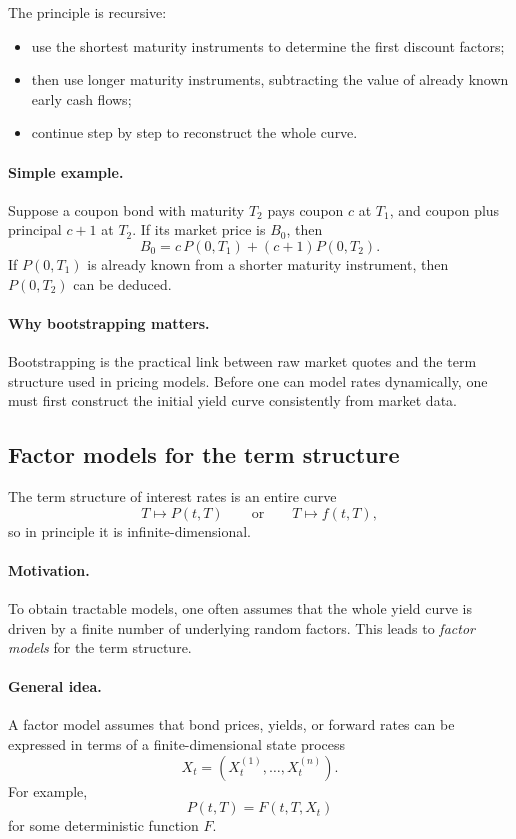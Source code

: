 \documentclass[11pt]{article}
\theoremstyle{plain}
\theoremstyle{definition}
\theoremstyle{remark}
\begin{document}
The principle is recursive:
\begin{itemize}[leftmargin=1.4em]
    \item use the shortest maturity instruments to determine the first
    discount factors;
    \item then use longer maturity instruments, subtracting the value of
    already known early cash flows;
    \item continue step by step to reconstruct the whole curve.
\end{itemize}

\paragraph{Simple example.}
Suppose a coupon bond with maturity \(T_2\) pays coupon \(c\) at
\(T_1\), and coupon plus principal \(c+1\) at \(T_2\).
If its market price is \(B_0\), then
\[
B_0=c\,P(0,T_1)+(c+1)P(0,T_2).
\]
If \(P(0,T_1)\) is already known from a shorter maturity instrument,
then \(P(0,T_2)\) can be deduced.

\paragraph{Why bootstrapping matters.}
Bootstrapping is the practical link between raw market quotes and the
term structure used in pricing models.
Before one can model rates dynamically, one must first construct the
initial yield curve consistently from market data.

\subsection{Factor models for the term structure}

The term structure of interest rates is an entire curve
\[
T\longmapsto P(t,T)
\qquad\text{or}\qquad
T\longmapsto f(t,T),
\]
so in principle it is infinite-dimensional.

\paragraph{Motivation.}
To obtain tractable models, one often assumes that the whole yield curve
is driven by a finite number of underlying random factors.
This leads to \emph{factor models} for the term structure.

\paragraph{General idea.}
A factor model assumes that bond prices, yields, or forward rates can be
expressed in terms of a finite-dimensional state process
\[
X_t=(X_t^{(1)},\dots,X_t^{(n)}).
\]
For example,
\[
P(t,T)=F(t,T,X_t)
\]
for some deterministic function \(F\).
\end{document}
